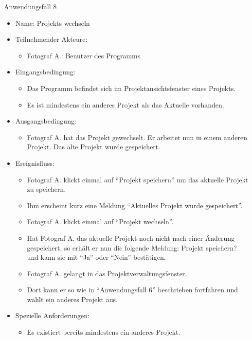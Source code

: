 		\begin{description}
		\item[Anwendungsfall 8]
	\end{description}
	
		\begin{itemize}
			\item Name: Projekts wechseln
			\item Teilnehmender Akteure:
			\begin{itemize}
				\item	Fotograf A.: Benutzer des Programms		
			\end{itemize}
			\item Eingangsbedingung:
			\begin{itemize}
				\item	Das Programm befindet sich im Projektansichtsfenster eines Projekts.
				\item Es ist mindestens ein anderes Projekt als das Aktuelle vorhanden.			
			\end{itemize}
			\item Ausgangsbedingung:
			\begin{itemize}
				\item	Fotograf A. hat das Projekt gewechselt. Er arbeitet nun in einem anderen Projekt. Das alte Projekt wurde gespeichert.
			\end{itemize}
			\item Ereignisfluss:
			\begin{itemize}
			  \item Fotograf A. klickt einmal auf "`Projekt speichern"' um das aktuelle Projekt zu speichern.
				\item Ihm erscheint kurz eine Meldung "`Aktuelles Projekt wurde gespeichert"'.
				\item Fotograf A. klickt einmal auf "`Projekt wechseln"'.
				\item Hat Fotograf A. das aktuelle Projekt noch nicht nach einer Änderung gespeichert, so erhält er nun die folgende Meldung: Projekt speichern? und kann sie mit "`Ja"' oder "`Nein"' bestätigen.
				\item Fotograf A. gelangt in das Projektverwaltungsfenster.
				\item Dort kann er so wie in "`Anwendungsfall 6"' beschrieben fortfahren und wählt ein anderes Projekt aus.
			\end{itemize}
			\item Spezielle Anforderungen:
			\begin{itemize}
				\item	Es existiert bereits mindestens ein anderes Projekt.		
			\end{itemize}			
		\end{itemize}

